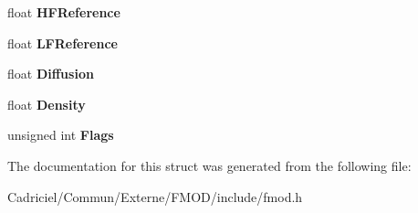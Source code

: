 \begin{DoxyCompactItemize}
\item 
\hypertarget{struct_f_m_o_d___r_e_v_e_r_b___p_r_o_p_e_r_t_i_e_s_ac0d48e7775cc35e434535d7b0f41d425}{float {\bfseries H\-F\-Reference}}\label{struct_f_m_o_d___r_e_v_e_r_b___p_r_o_p_e_r_t_i_e_s_ac0d48e7775cc35e434535d7b0f41d425}

\item 
\hypertarget{struct_f_m_o_d___r_e_v_e_r_b___p_r_o_p_e_r_t_i_e_s_ac3edfdcc94df619aa11f5163dfacbfd4}{float {\bfseries L\-F\-Reference}}\label{struct_f_m_o_d___r_e_v_e_r_b___p_r_o_p_e_r_t_i_e_s_ac3edfdcc94df619aa11f5163dfacbfd4}

\item 
\hypertarget{struct_f_m_o_d___r_e_v_e_r_b___p_r_o_p_e_r_t_i_e_s_ae4b36833e4d30de592c954af2f0c55b3}{float {\bfseries Diffusion}}\label{struct_f_m_o_d___r_e_v_e_r_b___p_r_o_p_e_r_t_i_e_s_ae4b36833e4d30de592c954af2f0c55b3}

\item 
\hypertarget{struct_f_m_o_d___r_e_v_e_r_b___p_r_o_p_e_r_t_i_e_s_a3672d989ace5e2dc4450b7677fa83f75}{float {\bfseries Density}}\label{struct_f_m_o_d___r_e_v_e_r_b___p_r_o_p_e_r_t_i_e_s_a3672d989ace5e2dc4450b7677fa83f75}

\item 
\hypertarget{struct_f_m_o_d___r_e_v_e_r_b___p_r_o_p_e_r_t_i_e_s_a8e2786c436b8b3fa9bc1cbfb3f3b629c}{unsigned int {\bfseries Flags}}\label{struct_f_m_o_d___r_e_v_e_r_b___p_r_o_p_e_r_t_i_e_s_a8e2786c436b8b3fa9bc1cbfb3f3b629c}

\end{DoxyCompactItemize}


The documentation for this struct was generated from the following file\-:\begin{DoxyCompactItemize}
\item 
Cadriciel/\-Commun/\-Externe/\-F\-M\-O\-D/include/fmod.\-h\end{DoxyCompactItemize}
